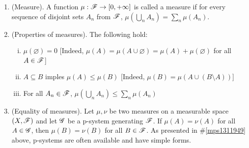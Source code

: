 \documentclass[a4paper,10pt]{article}
\begin{document}
\begin{enumerate}
 \item (Measure). A function $\mu: \mathscr{F}\to [0,+\infty]$ is called a measure if 
       for every sequence of disjoint sets $A_n$ from $\mathscr{F}$, $\mu(\bigcup_n A_n)= \sum_n \mu(A_n)$.

 \item (Properties of measures). The following hold:
      \begin{enumerate}[(i)]
       \item $\mu(\varnothing)=0$ [Indeed, $\mu(A) = \mu(A\cup \varnothing) = \mu(A) + \mu(\varnothing)$ for all $A\in\mathscr{F}$]
       \item $A\subseteq B$ imples $\mu(A) \leq \mu(B)$ [Indeed, $\mu(B) = \mu(A\cup (B\setminus A))$]
       \item For all $A_n\in\mathscr{F}$, $\mu(\bigcup_n A_n) \leq \sum_n \mu(A_n)$
      \end{enumerate}

 \item (Equality of measures). Let $\mu,\nu$ be two measures on a measurable space $(X,\mathscr{F})$ and let $\mathscr{G}$ 
       be a p-system generating $\mathscr{F}$. If $\mu(A) = \nu(A)$ for all $A\in \mathscr{G}$, then $\mu(B) = \nu(B)$
       for all $B\in\mathscr{F}$. As presented in \#\ref{mps1311949} above, p-systems are often available and 
       have simple forms.
      
\end{enumerate}
\end{document}
